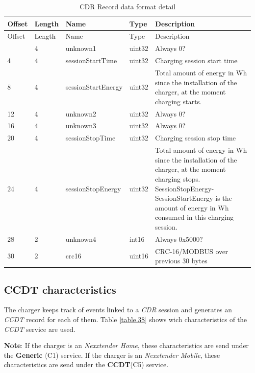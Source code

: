 \documentclass[a4paper]{article}
\begin{document}
\begin{longtable}[]{@{}llllp{9cm}@{}}
	\caption{CDR Record data format detail}
	\label{table.54}
	\tabularnewline
	\toprule\noalign{}
	Offset & Length & Name               & Type   & Description                          \\
	\midrule\noalign{}
	\endfirsthead
	\toprule\noalign{}
	Offset & Length & Name               & Type   & Description                          \\
	\midrule\noalign{}
	\endhead
	\bottomrule\noalign{}
	\endlastfoot
	0      & 4      & unknown1           & uint32 & Always 0?                            \\
	4      & 4      & sessionStartTime   & uint32 & Charging session start time          \\
	8      & 4      & sessionStartEnergy & uint32 & Total amount of energy in Wh since   
	the installation of the charger, at the moment charging starts. \\
	12     & 4      & unknown2           & uint32 & Always 0?                            \\
	16     & 4      & unknown3           & uint32 & Always 0?                            \\
	20     & 4      & sessionStopTime    & uint32 & Charging session stop time           \\
	24     & 4      & sessionStopEnergy  & uint32 & Total amount of energy in Wh since   
	the installation of the charger, at the moment charging stops.
	SessionStopEnergy-SessionStartEnergy is the amount of energy in Wh
	consumed in this charging session. \\
	28     & 2      & unknown4           & int16  & Always 0x5000?                            \\
	30     & 2      & crc16              & uint16 & CRC-16/MODBUS over previous 30 bytes \\
\end{longtable}

\subsection{CCDT characteristics}
\label{ccdt_characteristics}

The charger keeps track of events linked to a \emph{CDR} session and generates an \emph{CCDT} record for each of them.
Table \ref{table.38} shows wich characteristics of the \emph{CCDT} service are used.

\textbf{Note}: If the charger is an \emph{Nexxtender Home}, 
these characteristics are send under the \textbf{Generic} (C1) service. 
If the charger is an \emph{Nexxtender Mobile}, 
these characteristics are send under the \textbf{CCDT}(C5) service.
\end{document}
